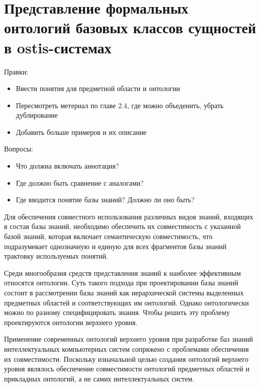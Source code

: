 \chapter{Представление формальных онтологий базовых классов сущностей в ostis-системах}
\label{chapter_top_ontologies}


Правки:
\begin{itemize}
	\item Ввести понятия для предметной области и онтологии
	\item Пересмотреть метериал по главе 2.4, где можно объеденить, убрать дублирование
	\item Добавить больше примеров и их описание
\end{itemize}

Вопросы:
\begin{itemize}
	\item Что должна включать аннотация?
	\item Где должно быть сравнение с аналогами?
	\item Где вводится понятие базы знаний? Должно ли оно быть?
\end{itemize}

Для обеспечения совместного использования различных видов знаний, входящих в состав базы знаний, необходимо обеспечить их совместимость с указанной базой знаний, которая включает семантическую совместимость, что подразумевает однозначную и единую для всех фрагментов базы знаний трактовку используемых понятий.

Среди многообразия средств представления знаний к наиболее эффективным относятся онтологии\cite{Davydenko2017}. Суть такого подхода при проектировании базы знаний состоит в рассмотрении базы знаний как иерархической системы выделенных предметных областей и соответствующих им онтологий. Однако онтологически можно по разному специфицировать знания. Чтобы решить эту проблему проектируются онтологии верхнего уровня.

Применение современных онтологий верхнего уровня при разработке баз знаний интеллектуальных компьютерных систем сопряжено с проблемами обеспечения их совместимости. Поскольку изначальной целью создания онтологий верхнего уровня являлось обеспечение  совместимости онтологий предметных областей и прикладных онтологий, а не самих интеллектуальных систем. 

